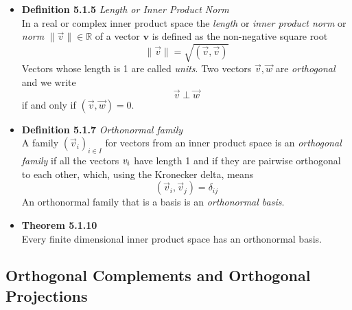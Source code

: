 \documentclass[11pt,a4paper]{article}
\begin{document}
\begin{itemize}
    \item \textbf{Definition 5.1.5} \emph{Length or Inner Product Norm} \\
        In a real or complex inner product space the \emph{length} or \emph{inner product norm}
        or \emph{norm} $\lVert \vec{v} \rVert \in \mathbb{R}$ of a vector $\textbf{v}$
        is defined as the non-negative square root
        \[
            \lVert \vec{v} \rVert = \sqrt{(\vec{v}, \vec{v})}
        \]
        Vectors whose length is 1 are called \emph{units}.
        Two vectors $\vec{v}, \vec{w}$ are \emph{orthogonal} and we write
        \[
            \vec{v} \perp \vec{w}
        \]
        if and only if $(\vec{v}, \vec{w}) = 0$.

    \item \textbf{Definition 5.1.7} \emph{Orthonormal family} \\
        A family ${(\vec{v}_i)}_{i \in I}$ for vectors from an inner product space is an
        \emph{orthogonal family} if all the vectors $\emph{v}_i$ have length 1 and if they
        are pairwise orthogonal to each other, which, using the Kronecker delta, means
        \[
            (\vec{v}_i, \vec{v}_j) = \delta_{ij}
        \]
        An orthonormal family that is a basis is an \emph{orthonormal basis}.

    \item \textbf{Theorem 5.1.10} \\
        Every finite dimensional inner product space has an orthonormal basis.

\end{itemize}

\subsection{Orthogonal Complements and Orthogonal Projections}
\end{document}
